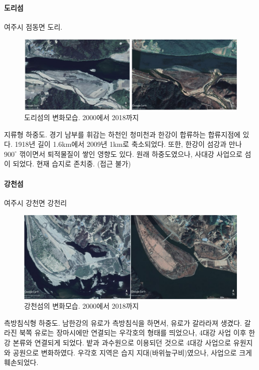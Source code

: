 \paragraph{도리섬}
여주시 점동면 도리.

\begin{figure}[ht]
    \centering
    \includegraphics[width=.8\textwidth]{img/도리섬.JPG}
    \caption{도리섬의 변화모습. 2000에서 2018까지 }
    \label{fig:my_labe611}
\end{figure}

지류형 하중도. 경기 남부를 휘감는 하천인 청미천과 한강이 합류하는 합류지점에 있다. 1918년 길이 1.6km에서 2009년 1km로 축소되었다.
또한, 한강이 섬강과 만나 $900^\circ$ 꺾이면서 퇴적물질이 쌓인 영향도 있다.
원래 하중도였으나, 사대강 사업으로 섬이 되었다. 현재 습지로 존치중. (접근 불가)

\paragraph{강천섬}
여주시 강천면 강천리

\begin{figure}[ht]
    \centering
    \includegraphics[width=.8\textwidth]{img/강천섬.jpg}
    \caption{강천섬의 변화모습. 2000에서 2018까지 }
    \label{fig:my_labe612}
\end{figure}

측방침식형 하중도. 남한강의 유로가 측방침식을 하면서, 유로가 갈라라져 생겼다.
갈라진 북쪽 유로는 장마시에만 연결되는 우각호의 형태를 띄었으나, 4대강 사업 이후 한강 본류와 연결되게 되었다.
밭과 과수원으로 이용되던 것으로 4대강 사업으로 유원지와 공원으로 변화하였다.
우각호 지역은 습지 지대(바위늪구비)였으나, 사업으로 크게 훼손되었다.

